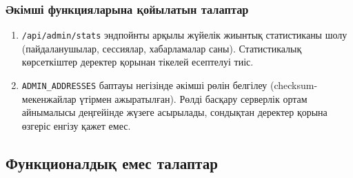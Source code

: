 \documentclass[14pt,a4paper]{extarticle}
\begin{document}
\subsubsection{Әкімші функцияларына қойылатын талаптар}

\begin{enumerate}[nosep]
\item \texttt{/api/admin/stats} эндпойнты арқылы жүйелік жиынтық статистиканы шолу (пайдаланушылар, сессиялар, хабарламалар саны). Статистикалық көрсеткіштер деректер қорынан тікелей есептелуі тиіс.
\item \texttt{ADMIN\_ADDRESSES} баптауы негізінде әкімші рөлін белгілеу (checksum-мекенжайлар үтірмен ажыратылған). Рөлді басқару серверлік ортам айнымалысы деңгейінде жүзеге асырылады, сондықтан деректер қорына өзгеріс енгізу қажет емес.
\end{enumerate}

\subsection{Функционалдық емес талаптар}
\end{document}
